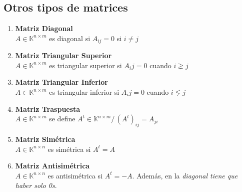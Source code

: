 \documentclass{article}
\newcommand{\tq}{/\,}                                   %
\newcommand{\cuerpo}{\mathbb{K}}                        %
\begin{document}
\subsection{Otros tipos de matrices}
\begin{enumerate}
    \item \textbf{Matriz Diagonal}
    \\$A \in \cuerpo^{n \times m}$ es diagonal si $A_{ij}=0$ si $i \neq j$
    \item \textbf{Matriz Triangular Superior}
    \\$A \in \cuerpo^{n \times m}$ es triangular superior si $A_ij=0$ cuando $i \gneq j$
    \item \textbf{Matriz Triangular Inferior}
    \\$A \in \cuerpo^{n \times m}$ es triangular inferior si $A_ij=0$ cuando $i \lneq j$
    \item \textbf{Matriz Traspuesta}
    \\$A \in \cuerpo^{n \times m}$ se define $A^t \in \cuerpo^{n \times m} \tq (A^t)_{ij}=A_{ji}$
    \item \textbf{Matriz Simétrica}
    \\$A \in \cuerpo^{n \times n}$ es simétrica si $A^t=A$
    \item \textbf{Matriz Antisimétrica}
    \\$A \in \cuerpo^{n \times n}$ es antisimétrica si $A^t=-A$. Además, en la \emph{diagonal tiene que haber solo 0s}.
\end{enumerate}
\end{document}
